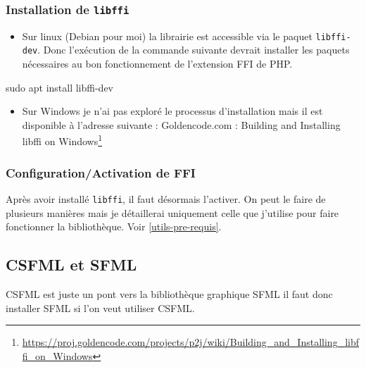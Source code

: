 \documentclass[11pt,a4paper,krantz2,11pt,oneside]{krantz}
\newenvironment{Shaded}{\begin{snugshade}}{\end{snugshade}}
\newcommand{\FunctionTok}[1]{\textcolor[rgb]{0,0,0}{#1}}
\newcommand{\NormalTok}[1]{#1}
\providecommand{\tightlist}{%
  \setlength{\itemsep}{0pt}\setlength{\parskip}{0pt}}
\renewcommand{\href}[2]{#2\footnote{\url{#1}}}
\begin{document}
\hypertarget{installation-de-libffi}{%
\subsubsection{\texorpdfstring{Installation de \texttt{libffi}}{Installation de libffi}}\label{installation-de-libffi}}

\begin{itemize}
\tightlist
\item
  Sur linux (Debian pour moi) la librairie est accessible via le paquet \texttt{libffi-dev}. Donc l'exécution de la commande suivante devrait installer les paquets nécessaires au bon fonctionnement de l'extension FFI de PHP.
\end{itemize}

\begin{Shaded}
\begin{Highlighting}[]
\FunctionTok{sudo}\NormalTok{ apt install libffi-dev}
\end{Highlighting}
\end{Shaded}

\begin{itemize}
\tightlist
\item
  Sur Windows je n'ai pas exploré le processus d'installation mais il est disponible à l'adresse suivante : \href{https://proj.goldencode.com/projects/p2j/wiki/Building_and_Installing_libffi_on_Windows}{Goldencode.com : Building and Installing libffi on Windows}
\end{itemize}

\hypertarget{configurationactivation-de-ffi}{%
\subsubsection{Configuration/Activation de FFI}\label{configurationactivation-de-ffi}}

Après avoir installé \texttt{libffi}, il faut désormais l'activer. On peut le faire de plusieurs manières mais je détaillerai uniquement celle que j'utilise pour faire fonctionner la bibliothèque. Voir \ref{utils-pre-requis}.

\hypertarget{csfml-et-sfml}{%
\subsection{CSFML et SFML}\label{csfml-et-sfml}}

CSFML est juste un pont vers la bibliothèque graphique SFML il faut donc installer SFML si l'on veut utiliser CSFML.
\end{document}
